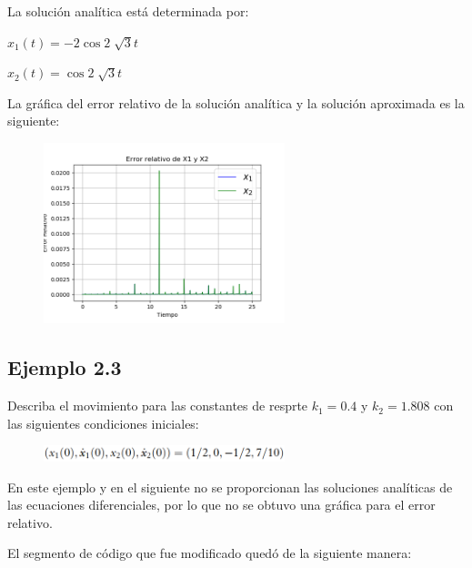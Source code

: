 \documentclass[a4paper]{article}
\begin{document}
La solución analítica está determinada por:
\begin{center}
$x_1(t)=-2\cos2\sqrt[]{3}t$

$x_2(t)=\cos2\sqrt[]{3}t$
\end{center}


La gráfica del error relativo de la solución analítica y la solución aproximada es la siguiente:

\begin{figure}[ht!]
\centering 
\includegraphics[width=70mm]{ErrorEx2_2.png}
\end{figure}

\newpage
\subsection{Ejemplo 2.3}
Describa el movimiento para las constantes de resprte $k_1=0.4$ y $k_2=1.808$ con las siguientes condiciones iniciales:

\begin{figure}[ht!]
\centering
\includegraphics[width=70mm]{Ejemplo2_3.PNG}
\end{figure}

En este ejemplo y en el siguiente no se proporcionan las soluciones analíticas de las ecuaciones diferenciales, por lo que no se obtuvo una gráfica para el error relativo.

El segmento de código que fue modificado quedó de la siguiente manera:
\end{document}
